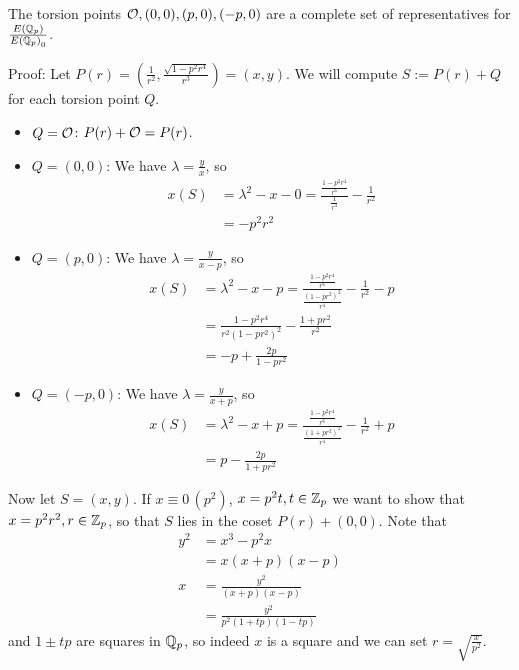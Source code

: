 \documentclass[12pt, a4paper]{amsart}
\begin{document}
\begin{lemma}
  The torsion points ${\mathcal O}, (0,0), (p,0), (-p,0)$ are a complete set of
  representatives for $\frac{{E({\mathbb Q}_p)}}{{E({\mathbb Q}_p)}_0}$.
\end{lemma}
Proof: Let $P(r) = (\frac{1}{r^2}, \frac{\sqrt{1-p^2r^4}}{r^3}) = (x,y)$. We will
compute $S := P(r) + Q$ for each torsion point $Q$.
\begin{itemize}
  \item $Q = {\mathcal O}$: $P(r) + {\mathcal O} = P(r)$.
  \item $Q = (0,0)$:
    We have $\lambda = \frac{y}{x}$, so
    \begin{equation*}
      \begin{split}
        x(S)
        &= \lambda^2 - x - 0 =
        \frac{\frac{1 - p^2r^4}{r^6}}{\frac{1}{r^4}} - \frac{1}{r^2} \\
        &= -p^2r^2
      \end{split}
    \end{equation*}
  \item $Q = (p, 0)$: We have $\lambda = \frac{y}{x-p}$, so
    \begin{equation*}
      \begin{split}
        x(S)
        &= \lambda^2 - x - p = 
        \frac{\frac{1 - p^2r^4}{r^6}}{\frac{(1-pr^2)^2}{r^4}} -
        \frac{1}{r^2} - p \\
        &= \frac{1-p^2r^4}{r^2(1-pr^2)^2} - \frac{1+pr^2}{r^2} \\
        &= -p + \frac{2p}{1-pr^2}
      \end{split}
    \end{equation*}
  \item $Q = (-p, 0)$: We have $\lambda = \frac{y}{x+p}$, so
    \begin{equation*}
      \begin{split}
        x(S)
        &= \lambda^2 - x + p = 
        \frac{\frac{1 - p^2r^4}{r^6}}{\frac{(1+pr^2)^2}{r^4}} -
        \frac{1}{r^2} + p \\
        &= p - \frac{2p}{1+pr^2}
      \end{split}
    \end{equation*}
\end{itemize}

Now let $S = (x,y)$.
If $x \equiv 0 \, (p^2)$, $x = p^2 t, t \in {\mathbb Z}_p$ we want to show that $x = p^2r^2, r \in {\mathbb Z}_p$, so that $S$ lies
in the coset $P(r) + (0,0)$. Note that
\begin{equation*}
  \begin{split}
    y^2 &= x^3 - p^2x \\
    &= x(x+p)(x-p) \\
    x &= \frac{y^2}{(x+p)(x-p)} \\
    &= \frac{y^2}{p^2(1+tp)(1-tp)}
  \end{split}
\end{equation*}
and $1 \pm tp$ are squares in ${\mathbb Q}_p$, so indeed $x$ is a square and we can set
$r = \sqrt{\frac{x}{p^2}}$.
\end{document}
